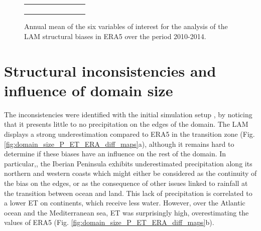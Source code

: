 \begin{figure}[htbp]
\begin{tabular}{ccc}
\begin{subfigure}[b]{0.33\textwidth}
        \end{subfigure}
    \end{tabular}
    \caption{Annual mean of the six variables of interest for the analysis of the LAM structural biases in ERA5 over the period 2010-2014.}
    \label{fig:ERA_var_maps}
\end{figure}

\section{Structural inconsistencies and influence of domain size}
\label{sec:domain_size}
The inconsistencies were identified with the initial simulation setup \smalld, by noticing that it presents little to no precipitation on the edges of the domain. The LAM displays a strong underestimation compared to ERA5 in the transition zone (Fig. \ref{fig:domain_size_P_ET_ERA_diff_maps}a), although it remains hard to determine if these biases have an influence on the rest of the domain. In particular,, the Iberian Peninsula exhibits underestimated precipitation along its northern and western coasts which might either be considered as the continuity of the bias on the edges, or as the consequence of other issues linked to rainfall at the transition between ocean and land.
This lack of precipitation is correlated to a lower ET on continents, which receive less water. However, over the Atlantic ocean and the Mediterranean sea, ET was surprisingly high, overestimating the values of ERA5 (Fig. \ref{fig:domain_size_P_ET_ERA_diff_maps}b). 

